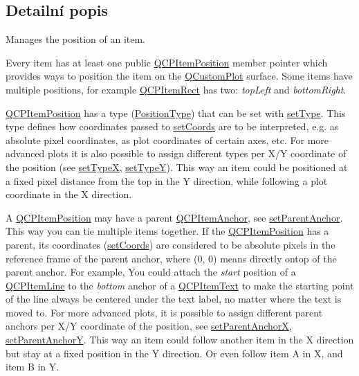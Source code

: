 \subsection{Detailní popis}
Manages the position of an item. 

Every item has at least one public \hyperlink{classQCPItemPosition}{Q\+C\+P\+Item\+Position} member pointer which provides ways to position the item on the \hyperlink{classQCustomPlot}{Q\+Custom\+Plot} surface. Some items have multiple positions, for example \hyperlink{classQCPItemRect}{Q\+C\+P\+Item\+Rect} has two\+: {\itshape top\+Left} and {\itshape bottom\+Right}.

\hyperlink{classQCPItemPosition}{Q\+C\+P\+Item\+Position} has a type (\hyperlink{classQCPItemPosition_aad9936c22bf43e3d358552f6e86dbdc8}{Position\+Type}) that can be set with \hyperlink{classQCPItemPosition_aa476abf71ed8fa4c537457ebb1a754ad}{set\+Type}. This type defines how coordinates passed to \hyperlink{classQCPItemPosition_aa988ba4e87ab684c9021017dcaba945f}{set\+Coords} are to be interpreted, e.\+g. as absolute pixel coordinates, as plot coordinates of certain axes, etc. For more advanced plots it is also possible to assign different types per X/\+Y coordinate of the position (see \hyperlink{classQCPItemPosition_a2113b2351d6d00457fb3559a4e20c3ea}{set\+Type\+X}, \hyperlink{classQCPItemPosition_ac2a454aa5a54c1615c50686601ec4510}{set\+Type\+Y}). This way an item could be positioned at a fixed pixel distance from the top in the Y direction, while following a plot coordinate in the X direction.

A \hyperlink{classQCPItemPosition}{Q\+C\+P\+Item\+Position} may have a parent \hyperlink{classQCPItemAnchor}{Q\+C\+P\+Item\+Anchor}, see \hyperlink{classQCPItemPosition_ac094d67a95d2dceafa0d50b9db3a7e51}{set\+Parent\+Anchor}. This way you can tie multiple items together. If the \hyperlink{classQCPItemPosition}{Q\+C\+P\+Item\+Position} has a parent, its coordinates (\hyperlink{classQCPItemPosition_aa988ba4e87ab684c9021017dcaba945f}{set\+Coords}) are considered to be absolute pixels in the reference frame of the parent anchor, where (0, 0) means directly ontop of the parent anchor. For example, You could attach the {\itshape start} position of a \hyperlink{classQCPItemLine}{Q\+C\+P\+Item\+Line} to the {\itshape bottom} anchor of a \hyperlink{classQCPItemText}{Q\+C\+P\+Item\+Text} to make the starting point of the line always be centered under the text label, no matter where the text is moved to. For more advanced plots, it is possible to assign different parent anchors per X/\+Y coordinate of the position, see \hyperlink{classQCPItemPosition_add71461a973927c74e42179480916d9c}{set\+Parent\+Anchor\+X}, \hyperlink{classQCPItemPosition_add5ec1db9d19cec58a3b5c9e0a0c3f9d}{set\+Parent\+Anchor\+Y}. This way an item could follow another item in the X direction but stay at a fixed position in the Y direction. Or even follow item A in X, and item B in Y.

